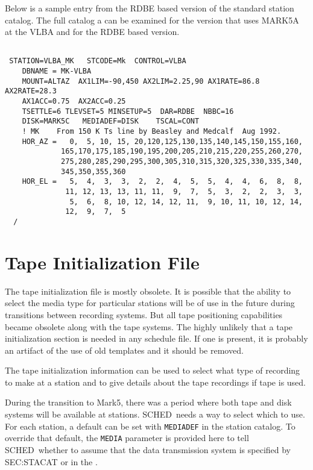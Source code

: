 \documentclass{report}
\newcommand{\schedb}{{\sc SCHED~}}
\begin{document}
\begin{description}
\end{description}

Below is a sample entry from the RDBE based version of the standard 
station catalog.  The full catalog a can be examined 
 for the 
version that uses MARK5A at the VLBA and 
 for the RDBE
based version.

\begin{verbatim}

 STATION=VLBA_MK   STCODE=Mk  CONTROL=VLBA 
    DBNAME = MK-VLBA
    MOUNT=ALTAZ  AX1LIM=-90,450 AX2LIM=2.25,90 AX1RATE=86.8 AX2RATE=28.3
    AX1ACC=0.75  AX2ACC=0.25
    TSETTLE=6 TLEVSET=5 MINSETUP=5  DAR=RDBE  NBBC=16 
    DISK=MARK5C   MEDIADEF=DISK    TSCAL=CONT
    ! MK    From 150 K Ts line by Beasley and Medcalf  Aug 1992.
    HOR_AZ =   0,  5, 10, 15, 20,120,125,130,135,140,145,150,155,160,
             165,170,175,185,190,195,200,205,210,215,220,255,260,270,
             275,280,285,290,295,300,305,310,315,320,325,330,335,340,
             345,350,355,360
    HOR_EL =   5,  4,  3,  3,  2,  2,  4,  5,  5,  4,  4,  6,  8,  8,
              11, 12, 13, 13, 11, 11,  9,  7,  5,  3,  2,  2,  3,  3,
               5,  6,  8, 10, 12, 14, 12, 11,  9, 10, 11, 10, 12, 14,
              12,  9,  7,  5
  / 

\end{verbatim}

\section{\label{SEC:TPINI}Tape Initialization File}

The tape initialization file is mostly obsolete.  It is possible that
the ability to select the media type for particular stations will be
of use in the future during transitions between recording systems.
But all tape positioning capabilities became obsolete along with the
tape systems.  The highly unlikely that a tape initialization section
is needed in any schedule file.  If one is present, it is probably an
artifact of the use of old templates and it should be removed.

The tape initialization information can be used to select what
type of recording to make at a station and to give details about
the tape recordings if tape is used.

During the transition to Mark5, there was a period where both
tape and disk systems will be available at stations.  \schedb needs
a way to select which to use.  For each station, a default can be
set with {\tt MEDIADEF} in the station catalog. To override that
default, the {\tt MEDIA} parameter is provided here to tell
\schedb whether to assume that the data transmission system is
specified by  {SEC:STACAT} or  in the .
\end{document}
